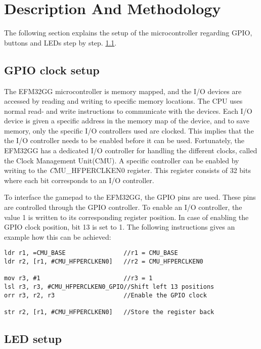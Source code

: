 \section{Description And Methodology}

The following section explains the setup of the microcontroller regarding GPIO, buttons and LEDs step by step. \ref{ch:initial_setup}. 


\subsection{GPIO clock setup} \label{ch:initial_setup}
The EFM32GG microcontroller is memory mapped, and the I/O devices are accessed by reading and writing to specific memory locations. The CPU uses normal read- and write instructions to communicate with the devices. Each I/O device is given a specific address in the memory map of the device, and to save memory, only the specific I/O controllers used are clocked. This implies that the the I/O controller needs to be enabled before it can be used. Fortunately, the EFM32GG has a dedicated I/O controller for handling the different clocks, called the Clock Management Unit(CMU). A specific controller can be enabled by writing to the \emph CMU\_HFPERCLKEN0 register. This register consists of 32 bits where each bit corresponds to an I/O controller. 

To interface the gamepad to the EFM32GG, the GPIO pins are used. These pins are controlled through the GPIO controller. To enable an I/O controller, the value 1 is written to its corresponding register position. In case of enabling the GPIO clock position, bit 13 is set to 1. The following instructions gives an example how this can be achieved: 

\begin{lstlisting}
ldr r1, =CMU_BASE                //r1 = CMU_BASE
ldr r2, [r1, #CMU_HFPERCLKEN0]   //r2 = CMU_HFPERCLKEN0 

mov r3, #1                       //r3 = 1
lsl r3, r3, #CMU_HFPERCLKEN0_GPIO//Shift left 13 positions
orr r3, r2, r3                   //Enable the GPIO clock

str r2, [r1, #CMU_HFPERCLKEN0]   //Store the register back 
\end{lstlisting}

\subsection{LED setup}

